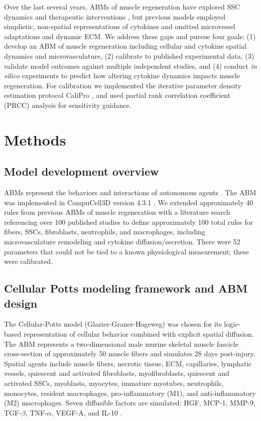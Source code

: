 \documentclass[11pt]{article}
\begin{document}
Over the last several years, ABMs of muscle regeneration have explored SSC dynamics and therapeutic interventions \citep{r8,r15,r16,r17,r18,r19}, but previous models employed simplistic, non-spatial representations of cytokines and omitted microvessel adaptations and dynamic ECM. We address these gaps and pursue four goals: (1) develop an ABM of muscle regeneration including cellular and cytokine spatial dynamics and microvasculature, (2) calibrate to published experimental data, (3) validate model outcomes against multiple independent studies, and (4) conduct \textit{in silico} experiments to predict how altering cytokine dynamics impacts muscle regeneration. For calibration we implemented the iterative parameter density estimation protocol CaliPro \citep{r20}, and used partial rank correlation coefficient (PRCC) analysis for sensitivity guidance.

\section{Methods}
\subsection{Model development overview}
ABMs represent the behaviors and interactions of autonomous agents \citep{r15,r21,r22}. The ABM was implemented in CompuCell3D version 4.3.1 \citep{r23}. We extended approximately 40 rules from previous ABMs of muscle regeneration \citep{r8,r15,r16} with a literature search referencing over 100 published studies to define approximately 100 total rules for fibers, SSCs, fibroblasts, neutrophils, and macrophages, including microvasculature remodeling and cytokine diffusion/secretion. There were 52 parameters that could not be tied to a known physiological measurement; these were calibrated.

\subsection{Cellular Potts modeling framework and ABM design}
The Cellular-Potts model \citep{r23} (Glazier-Graner-Hogeweg) was chosen for its logic-based representation of cellular behavior combined with explicit spatial diffusion. The ABM represents a two-dimensional male murine skeletal muscle fascicle cross-section of approximately 50 muscle fibers and simulates 28 days post-injury. Spatial agents include muscle fibers, necrotic tissue, ECM, capillaries, lymphatic vessels, quiescent and activated fibroblasts, myofibroblasts, quiescent and activated SSCs, myoblasts, myocytes, immature myotubes, neutrophils, monocytes, resident macrophages, pro-inflammatory (M1), and anti-inflammatory (M2) macrophages. Seven diffusible factors are simulated: HGF, MCP-1, MMP-9, TGF-$\beta$, TNF-$\alpha$, VEGF-A, and IL-10 \citep{r25,r26}.
\end{document}

